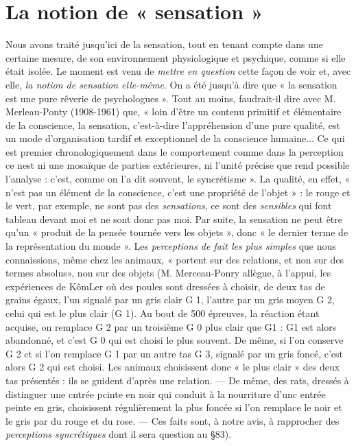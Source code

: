 \section{La notion de « sensation »}%
Nous avons traité jusqu'ici
de la sensation, tout en tenant compte dans une certaine mesure, de
son environnement physiologique et psychique, comme si elle était
isolée. Le moment est venu de {\it mettre en question} cette façon de voir
et, avec elle, {\it la notion de sensation elle-même}. On a été jusqu’à dire que
« la sensation est une pure rêverie de psychologues ». Tout au moins,
faudrait-il dire avec M. Merleau-Ponty (1908-1961) que, « loin d’être
un contenu primitif et élémentaire de la conscience, la sensation,
c'est-à-dire l'appréhension d’une pure qualité, est un mode d’organisation
tardif et exceptionnel de la conscience humaine... Ce qui est premier
chronologiquement dans le comportement comme dans la perception
ce nest ni une mosaïque de parties extérieures, ni l’unité précise que
rend possible l'analyse : c’est, comme on l’a dit souvent, le syncrétisme ».
La qualité, en effet, « n’est pas un élément de la conscience,
c’est une propriété de l’objet » : le rouge et le vert, par exemple, ne
sont pas des {\it sensations}, ce sont des {\it sensibles} qui font tableau devant
moi et ne sont donc pas moi. Par suite, la sensation ne peut être qu’un
« produit de la pensée tournée vers les objets », donc « le dernier terme
de la représentation du monde ». Les {\it perceptions de fait les plus simples}
que nous connaissions, même chez les animaux, « portent sur des
relations, et non sur des termes absolus», non sur des objets
{\scriptsize (M. Merceau-Ponry allègue, à l’appui, les expériences de KômLer où des poules
sont dressées à choisir, de deux tas de grains égaux, l’un signalé par un gris clair G 1,
l’autre par un gris moyen G 2, celui qui est le plus clair (G 1). Au bout de 500 épreuves,
la réaction étant acquise, on remplace G 2 par un troisième G 0 plus clair que G1 :
G1 est alors abandonné, et c’est G 0 qui est choisi le plus souvent. De même, si l’on
conserve G 2 ct si l’on remplace G 1 par un autre tas G 3, signalé par un gris foncé,
c'est alors G 2 qui est choisi. Les animaux choisissent donc « le plus clair » des deux tas
présentés : ils se guident d’après une relation. — De même, des rats, dressés à distinguer
une cntrée pcinte en noir qui conduit à la nourriture d’unc entrée peinte en gris, choisissent
régulièrement la plus foncée si l’on remplace le noir et le gris par du rouge et du
rose. — Ces faits sont, à notre avis, à rapprocher des {\it perceptions syncrétiques} dont il sera
question au \S 83)}.

